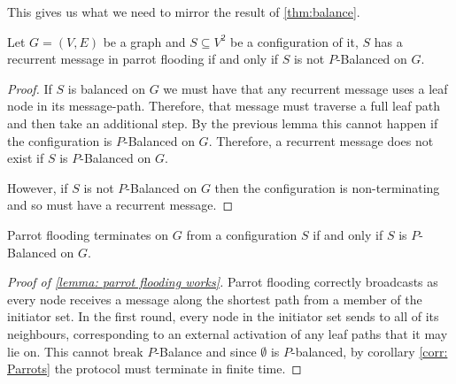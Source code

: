 This gives us what we need to mirror the result of \cref{thm:balance}.
\begin{lemma}
    Let $G=(V,E)$ be a graph and $S\subseteq V^2$ be a configuration of it, $S$ has a recurrent message in parrot flooding if and only if $S$ is not $P$-Balanced on $G$.
\end{lemma}
\begin{proof}
    If $S$ is balanced on $G$ we must have that any recurrent message uses a leaf node in its message-path. Therefore, that message must traverse a full leaf path and then take an additional step.
    By the previous lemma this cannot happen if the configuration is $P$-Balanced on $G$. 
    Therefore, a recurrent message does not exist if $S$ is $P$-Balanced on $G$.

    However, if $S$ is not $P$-Balanced on $G$ then the configuration is non-terminating and so must have a recurrent message.
\end{proof}
\begin{corollary}
    \label{corr: Parrots}
    Parrot flooding terminates on $G$ from a configuration $S$ if and only if $S$ is $P$-Balanced on $G$.
\end{corollary}
\begin{proof}[Proof of \ref{lemma: parrot flooding works}]
    Parrot flooding correctly broadcasts as every node receives a message along the shortest path from a member of the initiator set.
    In the first round, every node in the initiator set sends to all of its neighbours, corresponding to an external activation of any leaf paths that it may lie on.
    This cannot break $P$-Balance and since $\emptyset$ is $P$-balanced, by corollary \ref{corr: Parrots} the protocol must terminate in finite time. 
\end{proof}